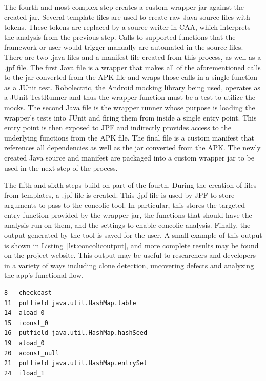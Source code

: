 \documentclass{sig-alternate-05-2015}
\begin{document}
The fourth and most complex step creates a custom wrapper jar against the created jar. Several template files are used to create raw Java source files with tokens.  These tokens are replaced by a source writer in CAA, which interprets the analysis from the previous step.  Calls to supported functions that the framework or user would trigger manually are automated in the source files.  There are two .java files and a manifest file created from this process, as well as a .jpf file. The first Java file is a wrapper that makes all of the aforementioned calls to the jar converted from the APK file and wraps those calls in a single function as a JUnit test. Robolectric, the Android mocking library being used, operates as a JUnit TestRunner and thus the wrapper function must be a test to utilize the mocks. The second Java file is the wrapper runner whose purpose is loading the wrapper's tests into JUnit and firing them from inside a single entry point. This entry point is then exposed to JPF and indirectly provides access to the underlying functions from the APK file.  The final file is a custom manifest that references all dependencies as well as the jar converted from the APK.  The newly created Java source and manifest are packaged into a custom wrapper jar to be used in the next step of the process.

The fifth and sixth steps build on part of the fourth. During the creation of files from templates, a .jpf file is created. This .jpf file is used by JPF to store arguments to pass to the concolic tool. In particular, this stores the targeted entry function provided by the wrapper jar, the functions that should have the analysis run on them, and the settings to enable concolic analysis. Finally, the output generated by the tool is saved for the user. A small example of this output is shown in Listing~\ref{lst:concolicoutput}, and more complete results may be found on the project website. This output may be useful to researchers and developers in a variety of ways including clone detection, uncovering defects and analyzing the app's functional flow.



\begin{lstlisting}[label=lst:concolicoutput, caption=Example Concolic Output]
8   checkcast
11  putfield java.util.HashMap.table
14  aload_0
15  iconst_0
16  putfield java.util.HashMap.hashSeed
19  aload_0
20  aconst_null
21  putfield java.util.HashMap.entrySet
24  iload_1
\end{lstlisting}
\end{document}
